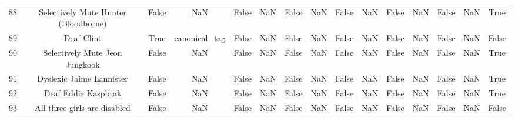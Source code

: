 \begin{table}[h!]
{\begin{tabular}{|c|c|c|c|c|c|c|c|c|c|c|c|c|c|c|}
         88 &              Selectively Mute Hunter (Bloodborne) &                          False &                       NaN &                          False &                       NaN &                          False &                       NaN &                          False &                       NaN &                          False &                       NaN &                          False &                       NaN &                           True \\
         89 &                                        Deaf Clint &                           True &             canonical\_tag &                          False &                       NaN &                          False &                       NaN &                          False &                       NaN &                          False &                       NaN &                          False &                       NaN &                          False \\
         90 &                    Selectively Mute Jeon Jungkook &                          False &                       NaN &                          False &                       NaN &                          False &                       NaN &                          False &                       NaN &                          False &                       NaN &                          False &                       NaN &                           True \\
         91 &                          Dyslexic Jaime Lannister &                          False &                       NaN &                          False &                       NaN &                          False &                       NaN &                          False &                       NaN &                          False &                       NaN &                          False &                       NaN &                           True \\
         92 &                               Deaf Eddie Kaspbrak &                          False &                       NaN &                          False &                       NaN &                          False &                       NaN &                          False &                       NaN &                          False &                       NaN &                          False &                       NaN &                           True \\
         93 &                      All three girls are disabled &                          False &                       NaN &                          False &                       NaN &                          False &                       NaN &                          False &                       NaN &                          False &                       NaN &                          False &                       NaN &                          False \\

\end{tabular}}
\end{table}
